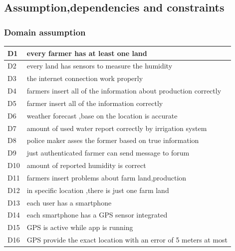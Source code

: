 \pagebreak

\subsection{Assumption,dependencies and constraints}
\subsubsection{Domain assumption}

\begin{table}[H]
\begin{tabular}{|m{2cm}|l|}
\hline
\normalsize	

D1 & every farmer has at least one land

\\\hline
D2 & every land has sensors to measure the humidity      \\\hline
D3 & the internet connection work properly\\\hline
D4 & farmers insert all of the information about production correctly \\\hline
D5 & farmer insert all of the information correctly \\\hline
D6 & weather forecast ,base on the location is accurate \\\hline
D7 & amount of used water report correctly by irrigation system\\\hline
D8 & police maker asses the former based on true information\\\hline
D9 & just authenticated farmer can send message to forum \\\hline
D10 & amount of reported humidity is correct \\\hline
D11 & farmers insert problems about farm land,production  \\\hline
D12 & in specific location ,there is just one farm land \\\hline
D13 & each user has a smartphone \\\hline
D14 & each smartphone has a GPS sensor integrated  \\\hline 
D15 & GPS is active while app is running \\\hline
D16 & GPS provide the exact location  with an error  of 5 meters at most \\\hline

\hline
\end{tabular}
\end{table}